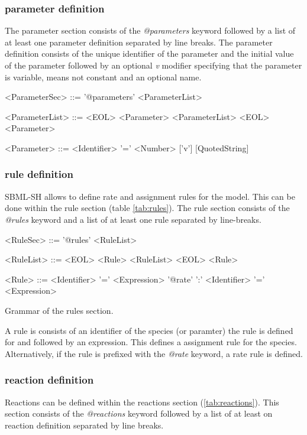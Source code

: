 \documentclass[a4paper]{article}
\begin{document}
\subsubsection*{parameter definition}
The parameter section consists of the \emph{@parameters} keyword followed by a list of at least one parameter definition separated by line breaks. The parameter definition consists of the unique identifier of the parameter and the initial value of the parameter followed by an optional \emph{v} modifier specifying that the parameter is variable, means not constant and an optional name.

\begin{table} [h!]
\begin{grammar}
<ParameterSec> ::= '@parameters' <ParameterList>

<ParameterList> ::= <EOL> <Parameter> <ParameterList>
  \alt <EOL> <Parameter>
  
<Parameter> ::= <Identifier> '=' <Number> ['v'] [QuotedString]
\end{grammar}
\end{table}


\subsubsection*{rule definition}
SBML-SH allows to define rate and assignment rules for the model. This can be done within the rule section (table \ref{tab:rules}). The rule section consists of the \emph{@rules} keyword and a list of at least one rule separated by line-breaks. 

\begin{table}[h!]
\begin{grammar}
<RuleSec> ::= '@rules' <RuleList>

<RuleList> ::= <EOL> <Rule> <RuleList>
  \alt <EOL> <Rule>
  
<Rule> ::= <Identifier> '=' <Expression>
\alt '@rate' ':' <Identifier> '=' <Expression>
\end{grammar}
\caption{Grammar of the rules section.} \label{tab:rules}
\end{table}

A rule is consists of an identifier of the species (or paramter) the rule is defined for and followed by an expression. This defines a assignment rule for the species. Alternatively, if the rule is prefixed with the \emph{@rate} keyword, a rate rule is defined.


\subsubsection*{reaction definition}
Reactions can be defined within the reactions section (\ref{tab:reactions}). This section consists of the \emph{@reactions} keyword followed by a list of at least on reaction definition separated by line breaks. 
\end{document}
